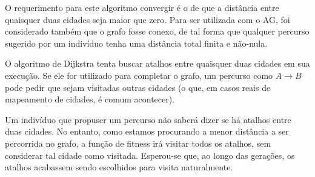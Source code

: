 O requerimento para este algoritmo convergir é o de que a distância entre quaisquer duas cidades seja maior que zero. Para ser utilizada com o AG, foi considerado também que o grafo fosse conexo, de tal forma que qualquer percurso sugerido por um indivíduo tenha uma distância total finita e não-nula.

O algoritmo de Dijkstra tenta buscar atalhos entre quaisquer duas cidades em sua execução. Se ele for utilizado para completar o grafo, um percurso como $A \rightarrow B$ pode pedir que sejam visitadas outras cidades (o que, em casos reais de mapeamento de cidades, é comum acontecer).

Um indivíduo que propuser um percurso não saberá dizer se há atalhos entre duas cidades. No entanto, como estamos procurando a menor distância a ser percorrida no grafo, a função de fitness irá visitar todos os atalhos, sem considerar tal cidade como visitada. Esperou-se que, ao longo das gerações, os atalhos acabassem sendo escolhidos para visita naturalmente.
